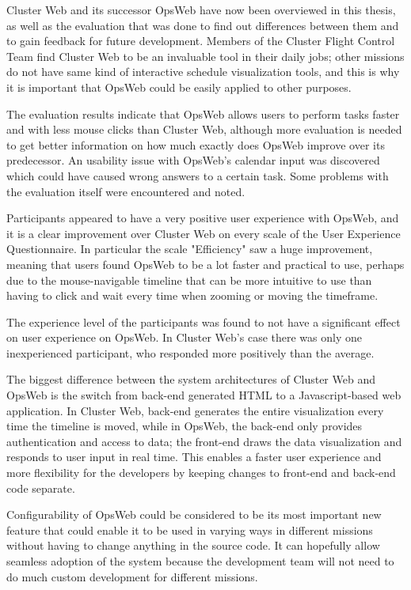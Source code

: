 
Cluster Web and its successor OpsWeb have now been overviewed in this thesis, as well as the evaluation that was done to find out differences between them and to gain feedback for future development. Members of the Cluster Flight Control Team find Cluster Web to be an invaluable tool in their daily jobs; other missions do not have same kind of interactive schedule visualization tools, and this is why it is important that OpsWeb could be easily applied to other purposes.

The evaluation results indicate that OpsWeb allows users to perform tasks faster and with less mouse clicks than Cluster Web, although more evaluation is needed to get better information on how much exactly does OpsWeb improve over its predecessor. An usability issue with OpsWeb's calendar input was discovered which could have caused wrong answers to a certain task. Some problems with the evaluation itself were encountered and noted.

Participants appeared to have a very positive user experience with OpsWeb, and it is a clear improvement over Cluster Web on every scale of the User Experience Questionnaire. In particular the scale "Efficiency" saw a huge improvement, meaning that users found OpsWeb to be a lot faster and practical to use, perhaps due to the mouse-navigable timeline that can be more intuitive to use than having to click and wait every time when zooming or moving the timeframe.

The experience level of the participants was found to not have a significant effect on user experience on OpsWeb. In Cluster Web's case there was only one inexperienced participant, who responded more positively than the average.

The biggest difference between the system architectures of Cluster Web and OpsWeb is the switch from back-end generated HTML to a Javascript-based web application. In Cluster Web, back-end generates the entire visualization every time the timeline is moved, while in OpsWeb, the back-end only provides authentication and access to data; the front-end draws the data visualization and responds to user input in real time. This enables a faster user experience and more flexibility for the developers by keeping changes to front-end and back-end code separate.

Configurability of OpsWeb could be considered to be its most important new feature that could enable it to be used in varying ways in different missions without having to change anything in the source code. It can hopefully allow seamless adoption of the system because the development team will not need to do much custom development for different missions. 

